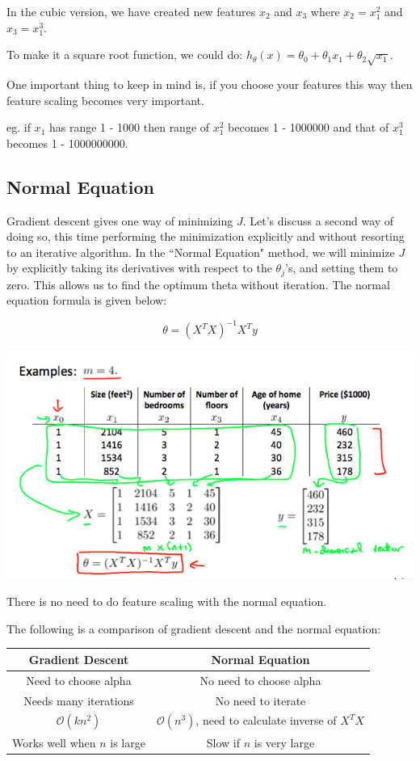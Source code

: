 \documentclass[UTF8]{article}
\begin{document}
In the cubic version, we have created new features $x_2$ and $x_3$ where $x_2=x_1^2$ and $x_3=x_1^3$.

To make it a square root function, we could do: $h_\theta(x) = \theta_0 + \theta_1 x_1 + \theta_2 \sqrt{x_1}$.

One important thing to keep in mind is, if you choose your features this way then feature scaling becomes very important.

eg. if $x_1$ has range 1 - 1000 then range of $x_1^2$ becomes 1 - 1000000 and that of $x_1^3$ becomes 1 - 1000000000.

\subsection{Normal Equation}

Gradient descent gives one way of minimizing $J$. Let's discuss a second way of doing so, this time performing the minimization explicitly and without resorting to an iterative algorithm. In the ``Normal Equation" method, we will minimize $J$ by explicitly taking its derivatives with respect to the $\theta_j$'s, and setting them to zero. This allows us to find the optimum theta without iteration. The normal equation formula is given below:

\[ \theta = (X^T X)^{-1}X^T y \]

\includegraphics[width = \textwidth]{NotePics/4_4_1.png}

There is no need to do feature scaling with the normal equation.

The following is a comparison of gradient descent and the normal equation:

\begin{tabular}{|c|c|}
 \hline
Gradient Descent & Normal Equation\\
 \hline
Need to choose alpha & No need to choose alpha \\
 \hline
Needs many iterations & No need to iterate \\
 \hline
$\mathcal{O}{(kn^2)}$ & $\mathcal{O}{(n^3)}$, need to calculate inverse of $X^T X$ \\
 \hline
Works well when $n$ is large & Slow if $n$ is very large \\
 \hline
\end{tabular}
\end{document}
